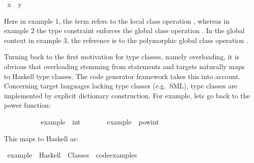 \begin{isabellebody}
\isanewline
\isanewline
{}\isamarkupfalse%
\isanewline
\isanewline
{}\isamarkupfalse%
\ {\isachardoublequoteopen}x\ {\isasymotimes}\ y{\isachardoublequoteclose}\ %
%
\begin{isamarkuptext}%
\noindent Here in example 1, the term refers to the local class operation
  , whereas in example 2 the type constraint
  enforces the global class operation .
  In the global context in example 3, the reference is
  to the polymorphic global class operation .%
\end{isamarkuptext}%
\isamarkuptrue%
%
\isamarkuptrue%
%
\begin{isamarkuptext}%
Turning back to the first motivation for type classes,
  namely overloading, it is obvious that overloading
  stemming from \isa{{\isasymCLASS}} statements and
  \isa{{\isasymINSTANTIATION}}
  targets naturally maps to Haskell type classes.
  The code generator framework \cite{isabelle-codegen} 
  takes this into account.  Concerning target languages
  lacking type classes (e.g.~SML), type classes
  are implemented by explicit dictionary construction.
  For example, lets go back to the power function:%
\end{isamarkuptext}%
\isamarkuptrue%
\ \ \ \ \isamarkupfalse%
\isanewline
\ \ \ \ \ \ example\ {\isacharcolon}{\isacharcolon}\ int\ \isanewline
\ \ \ \ \ \ {\isachardoublequoteopen}example\ {\isacharequal}\ pow{\isacharunderscore}int\ {}{}\ {\isacharparenleft}{\isacharminus}{}{\isacharparenright}{\isachardoublequoteclose}%
\begin{isamarkuptext}%
\noindent This maps to Haskell as:%
\end{isamarkuptext}%
\isamarkuptrue%
\isamarkupfalse%
\ example\ \ Haskell\ \ Classes\ \ {\isachardoublequoteopen}code{\isacharunderscore}examples{\isacharslash}{\isachardoublequoteclose}%
\begin{isamarkuptext}%


\end{isamarkuptext}
\end{isabellebody}
